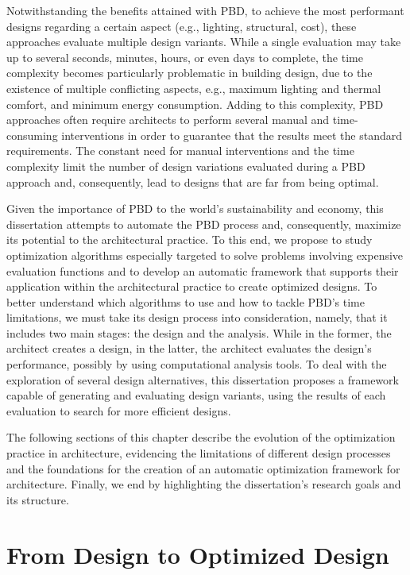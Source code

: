 	Notwithstanding the benefits attained with \ac{PBD}, to achieve the most performant designs regarding a certain aspect (e.g., lighting, structural, cost), these approaches evaluate multiple design variants. While a single evaluation may take up to several seconds, minutes, hours, or even days to complete, the time complexity becomes particularly problematic in building design, due to the existence of multiple conflicting aspects, e.g., maximum lighting and thermal comfort, and minimum energy consumption. Adding to this complexity, \ac{PBD} approaches often require architects to perform several manual and time-consuming interventions in order to guarantee that the results meet the standard requirements. The constant need for manual interventions and the time complexity limit the number of design variations evaluated during a \ac{PBD} approach and, consequently, lead to designs that are far from being optimal.  
	
	Given the importance of \ac{PBD} to the world's sustainability and economy, this dissertation attempts to automate the \ac{PBD} process and, consequently, maximize its potential to the architectural practice. To this end, we propose to study optimization algorithms especially targeted to solve problems involving expensive evaluation functions and to develop an automatic framework that supports their application within the architectural practice to create optimized designs. To better understand which algorithms to use and how to tackle \ac{PBD}'s time limitations, we must take its design process into consideration, namely, that it includes two main stages: the design and the analysis. While in the former, the architect creates a design, in the latter, the architect evaluates the design's performance, possibly by using computational analysis tools. To deal with the exploration of several design alternatives, this dissertation proposes a framework capable of generating and evaluating design variants, using the results of each evaluation to search for more efficient designs.
	
	The following sections of this chapter describe the evolution of the optimization practice in architecture, evidencing the limitations of different design processes and the foundations for the creation of an automatic optimization framework for architecture. Finally, we end by highlighting the dissertation's research goals and its structure.

\section{From Design to Optimized Design}
	

